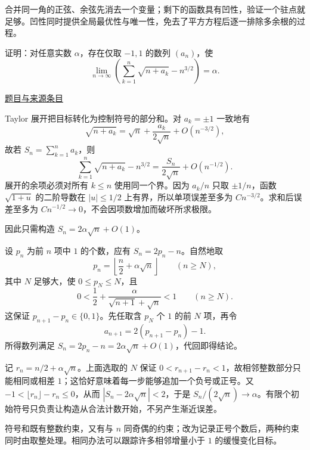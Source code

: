 \documentclass[UTF8,12pt,a4paper,fontset=fandol]{ctexart}
\begin{document}
\begin{remark}[方法与条件]合并同一角的正弦、余弦先消去一个变量；剩下的函数具有凹性，验证一个驻点就足够。凹性同时提供全局最优性与唯一性，免去了平方方程后逐一排除多余根的过程。\end{remark}

\begin{example}[来源序号5]\label{ex:pre03-math:5}\label{pr:pre03-math:5}

证明：对任意实数 $\alpha$，存在仅取 $-1,1$ 的数列 $(a_n)$，使
\[
\lim_{n\to\infty}
\left(\sum_{k=1}^n\sqrt{n+a_k}-n^{3/2}\right)=\alpha.
\]

\par\href{https://github.com/lzxcr/cmc-mathematics/blob/64916fa1fdbc3e444a652eca204d5669058ee321/src/problems/preliminary/03/05.md}{题目与来源条目}

\end{example}

\begin{solve}\label{ans:pre03-math:5}

Taylor 展开把目标转化为控制符号的部分和。对 $a_k=\pm1$ 一致地有
\[
\sqrt{n+a_k}=\sqrt n+\frac{a_k}{2\sqrt n}+O(n^{-3/2}),
\]
故若 $S_n=\sum_{k=1}^na_k$，则
\[
\sum_{k=1}^n\sqrt{n+a_k}-n^{3/2}
=\frac{S_n}{2\sqrt n}+O(n^{-1/2}).
\]
展开的余项必须对所有 $k\le n$ 使用同一个界。因为 $a_k/n$ 只取 $\pm1/n$，函数 $\sqrt{1+u}$ 的二阶导数在 $|u|\le1/2$ 上有界，所以单项误差至多为 $Cn^{-3/2}$。求和后误差至多为 $Cn^{-1/2}\to0$，不会因项数增加而破坏所求极限。

因此只需构造 $S_n=2\alpha\sqrt n+O(1)$。

设 $p_n$ 为前 $n$ 项中 $1$ 的个数，应有 $S_n=2p_n-n$。自然地取
\[
p_n=\left\lfloor\frac n2+\alpha\sqrt n\right\rfloor
\qquad(n\ge N),
\]
其中 $N$ 足够大，使 $0\le p_N\le N$，且
\[
0<\frac12+\frac{\alpha}{\sqrt{n+1}+\sqrt n}<1
\qquad(n\ge N).
\]
这保证 $p_{n+1}-p_n\in\{0,1\}$。先任取含 $p_N$ 个 $1$ 的前 $N$ 项，再令
\[
a_{n+1}=2(p_{n+1}-p_n)-1.
\]
所得数列满足 $S_n=2p_n-n=2\alpha\sqrt n+O(1)$，代回即得结论。

记 $r_n=n/2+\alpha\sqrt n$。上面选取的 $N$ 保证 $0<r_{n+1}-r_n<1$，故相邻整数部分只能相同或相差 $1$；这恰好意味着每一步能够追加一个负号或正号。又 $-1<\lfloor r_n\rfloor-r_n\le0$，从而 $|S_n-2\alpha\sqrt n|<2$，于是 $S_n/(2\sqrt n)\to\alpha$。有限个初始符号只负责让构造从合法计数开始，不另产生渐近误差。

\end{solve}

\begin{remark}[方法与条件]符号和既有整数约束，又有与 $n$ 同奇偶的约束；改为记录正号个数后，两种约束同时由取整处理。相同办法可以跟踪许多相邻增量小于 $1$ 的缓慢变化目标。\end{remark}
\end{document}
